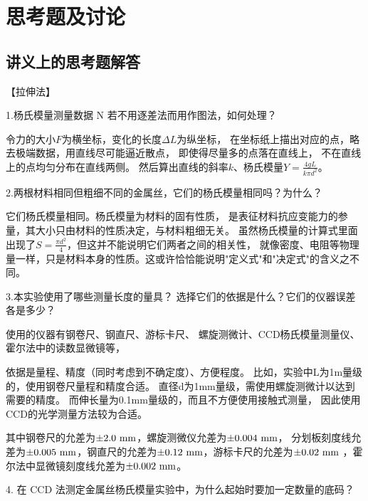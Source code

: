 \documentclass[11pt]{article}
\begin{document}
\newpage
\section{思考题及讨论}

\subsection{讲义上的思考题解答}

\noindent【拉伸法】
\bigskip

\begin{kaishu}
    \large  1.杨氏模量测量数据 N 若不用逐差法而用作图法，如何处理？
\end{kaishu}

令力的大小$F$为横坐标，变化的长度$\Delta L$为纵坐标，
在坐标纸上描出对应的点，略去极端数据，用直线尽可能逼近散点，
即使得尽量多的点落在直线上，
不在直线上的点均匀分布在直线两侧。
然后算出直线的斜率$k$、杨氏模量$Y=\frac{4gL}{k\pi d^2}$。

\bigskip
\begin{kaishu}
    \large 2.两根材料相同但粗细不同的金属丝，它们的杨氏模量相同吗？为什么？
\end{kaishu}

它们杨氏模量相同。杨氏模量为材料的固有性质，
是表征材料抗应变能力的参量，其大小只由材料的性质决定，与材料粗细无关。
虽然杨氏模量的计算式里面出现了$S=\frac{\pi d^2}{4}$，但这并不能说明它们两者之间的相关性，
就像密度、电阻等物理量一样，只是材料本身的性质。这或许恰恰能说明"定义式"和"决定式"的含义之不同。

\bigskip
\begin{kaishu}
    \large 3.本实验使用了哪些测量长度的量具？
    选择它们的依据是什么？它们的仪器误差各是多少？
\end{kaishu}

使用的仪器有钢卷尺、钢直尺、游标卡尺、
螺旋测微计、CCD杨氏模量测量仪、霍尔法中的读数显微镜等，

依据是量程、精度（同时考虑到不确定度）、方便程度。
比如，实验中L为1m量级的，使用钢卷尺量程和精度合适。
直径d为1mm量级，需使用螺旋测微计以达到需要的精度。
而伸长量为0.1mm量级的，而且不方便使用接触式测量，
因此使用CCD的光学测量方法较为合适。

其中钢卷尺的允差为$\pm 2.0\,\,{\rm mm}$，螺旋测微仪允差为$\pm 0.004\,\,{\rm mm}$，
分划板刻度线允差为$\pm 0.005\,\,{\rm mm}$，钢直尺的允差为$\pm 0.12\,\,{\rm mm}$，游标卡尺的允差为$\pm 0.02\,\,{\rm mm}$
，霍尔法中显微镜刻度线允差为$\pm 0.002\,\,{\rm mm}$。


\bigskip
\begin{kaishu}
    \large  4. 在 CCD 法测定金属丝杨氏模量实验中，为什么起始时要加一定数量的底码？
\end{kaishu}
\end{document}
